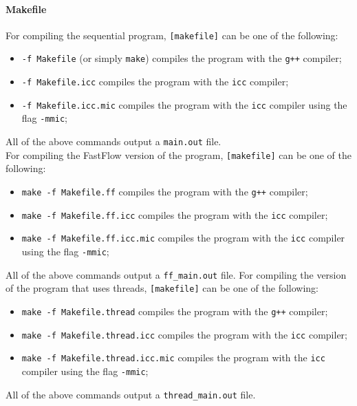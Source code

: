 \documentclass[10pt]{article}
\numberwithin{equation}{section}
\begin{document}
\begin{itemize}
\paragraph{Makefile}
For compiling the sequential program, \verb|[makefile]| can be one of the following:
\begin{itemize}
	\item \verb|-f Makefile| (or simply \verb|make|) compiles the program with the \verb|g++| compiler;
	\item \verb|-f Makefile.icc| compiles the program with the \verb|icc| compiler;
	\item \verb|-f Makefile.icc.mic| compiles the program with the \verb|icc| compiler using the flag \verb|-mmic|;
\end{itemize}
All of the above commands output a \verb|main.out| file.\\
For compiling the FastFlow version of the program, \verb|[makefile]| can be one of the following:
\begin{itemize}
	\item \verb|make -f Makefile.ff| compiles the program with the \verb|g++| compiler;
	\item \verb|make -f Makefile.ff.icc| compiles the program with the \verb|icc| compiler;
	\item \verb|make -f Makefile.ff.icc.mic| compiles the program with the \verb|icc| compiler using the flag \verb|-mmic|;
\end{itemize}
All of the above commands output a \verb|ff_main.out| file.
For compiling the version of the program that uses threads, \verb|[makefile]| can be one of the following:
\begin{itemize}
	\item \verb|make -f Makefile.thread| compiles the program with the \verb|g++| compiler;
	\item \verb|make -f Makefile.thread.icc| compiles the program with the \verb|icc| compiler;
	\item \verb|make -f Makefile.thread.icc.mic| compiles the program with the \verb|icc| compiler using the flag \verb|-mmic|;
\end{itemize}
All of the above commands output a \verb|thread_main.out| file.

\end{itemize}
\end{document}
